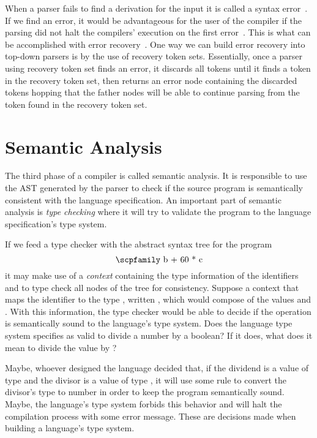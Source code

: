\documentclass[
  oneside,
  english,
  coorientadorbanca,
  noabntexcite
]{ufsc-thesis-rn46-2019}
\newcommand{\codett}[1]{\text{\scpfamily#1}}
\newcommand{\code}[1]{\text{\scpfamily\setlength\spaceskip{0.35em}#1}}
\newcommand{\typer}[2]{\code{#1 \codett{:} #2}}
\begin{document}
When a parser fails to find a derivation for the input it is called a syntax error~\cite{appel2003modern}.
If we find an error, it would be advantageous for the user of the compiler if the parsing did not halt the compilers' execution on the first error~\cite{appel2003modern}.
This is what can be accomplished with error recovery~\cite{appel2003modern}.
One way we can build error recovery into top-down parsers is by the use of recovery token sets.
Essentially, once a parser using recovery token set finds an error, it discards all tokens until it finds a token in the recovery token set, then returns an error node containing the discarded tokens hopping that the father nodes will be able to continue parsing from the token found in the recovery token set.

\section{Semantic Analysis}\label{chapter:background:sec:semantic}

The third phase of a compiler is called semantic analysis.
It is responsible to use the AST generated by the parser to check if the source program is semantically consistent with the language specification.
An important part of semantic analysis is \textit{type checking} where it will try to validate the program to the language specification's type system.

If we feed a type checker with the abstract syntax tree for the program
\begin{equation*}
  \codett{b + 60 * c}
\end{equation*}
it may make use of a \textit{context} containing the type information of the identifiers \code{b} and \code{c} to type check all nodes of the tree for consistency.
Suppose a context that maps the identifier \code{c} to the type \code{Bool}, written \typer{c}{Bool}, which would compose of the values \code{true} and \code{false}.
With this information, the type checker would be able to decide if the operation \code{60 * c} is semantically sound to the language's type system.
Does the language type system specifies as valid to divide a number by a boolean?
If it does, what does it mean to divide the value \codett{60} by \codett{false}?

Maybe, whoever designed the language decided that, if the dividend is a value of type \code{Int} and the divisor is a value of type \code{Bool}, it will use some rule to convert the divisor's type to number in order to keep the program semantically sound.
Maybe, the language's type system forbids this behavior and will halt the compilation process with some error message.
These are decisions made when building a language's type system.
\end{document}

